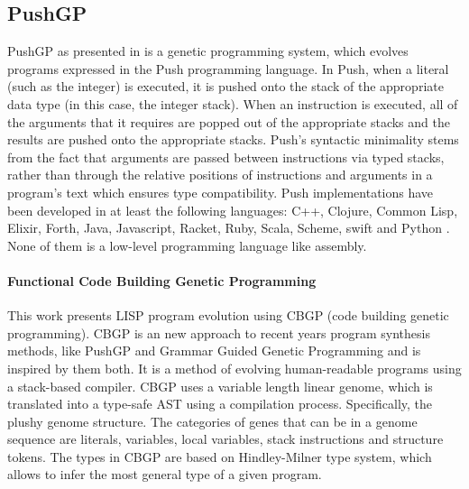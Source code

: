 \documentclass[dvipsnames,format=sigconf,anonymous=true,review=true]{acmart}
\begin{document}
\subsection{PushGP}
\label{PushGP}
PushGP as presented in \cite{Spector2002Genetic} is a genetic programming system, which evolves programs expressed in the Push programming language. In Push, when a literal (such as the integer) is executed, it is pushed onto the stack of the appropriate data type (in this case, the integer stack). When an instruction is executed, all of the arguments that it requires are popped out of the appropriate stacks and the results are pushed onto the appropriate stacks. Push’s syntactic minimality stems from the fact that arguments are passed between instructions via typed stacks, rather than through the relative positions of instructions and arguments in
a program’s text which ensures type compatibility. Push implementations have been developed in at least the following languages: C++, Clojure, Common Lisp, Elixir, Forth, Java, Javascript, Racket, Ruby, Scala, Scheme, swift and Python \cite{Pantridge2017PyshGP}. 
None of them is a low-level programming language like assembly.

\paragraph{Functional Code Building Genetic Programming}
This work \cite{edward2022functional} presents LISP program evolution using CBGP (code building genetic programming). CBGP is an new approach to recent years program synthesis methods, like PushGP and Grammar Guided Genetic Programming and is inspired by them both. It is a method of evolving human-readable programs using a stack-based compiler. CBGP uses a variable length linear genome, which is translated into a type-safe AST using a compilation process. Specifically, the plushy genome structure. The categories of genes that can be in a genome sequence are literals, variables, local variables, stack instructions and structure tokens. 
The types in CBGP are based on Hindley-Milner type system, which allows to infer the most general type of a given program. 
\end{document}

